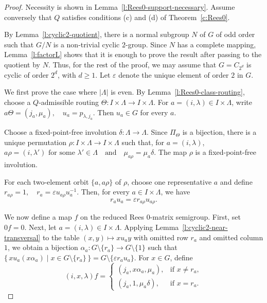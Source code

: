 \documentclass[11pt]{article}
\theoremstyle{plain}
\theoremstyle{remark}
\theoremstyle{definition}
\theoremstyle{plain}
\begin{document}
\begin{proof}
Necessity is shown in Lemma~\ref{l:Rees0-support-necessary}. Assume conversely that
$Q$ satisfies conditions \textup{(c)} and \textup{(d)} of Theorem~\ref{c:Rees0}.

By Lemma~\ref{l:cyclic2-quotient}, there is a normal subgroup $N$ of $G$ of
odd order such that $G/N$ is a non-trivial cyclic $2$-group. Since $N$ has a
complete mapping, Lemma~\ref{l:factorL} shows that it is enough to prove the
result after passing to the quotient by $N$. Thus, for the rest of the proof,
we may assume that
\(G=C_{2^d}\)
is cyclic of order $2^d$, with $d\ge1$. Let $\varepsilon$ denote the unique
element of order $2$ in $G$.

We first prove the case where $|\Lambda|$ is even. By
Lemma~\ref{l:Rees0-class-routing}, choose a $Q$-admissible routing
\(\Theta\colon I\times\Lambda\longrightarrow I\times\Lambda.\)
For $a=(i,\lambda)\in I\times\Lambda$, write
\(a\Theta=(j_a,\mu_a), \quad u_a=p_{\lambda,j_a}.\)
Then $u_a\in G$ for every $a$.

Choose a fixed-point-free involution
\(\delta\colon \Lambda\longrightarrow\Lambda.\)
Since $\Pi_\Theta$ is a bijection, there is a unique permutation
\(\rho\colon I\times\Lambda\longrightarrow I\times\Lambda\)
such that, for $a=(i,\lambda)$,
\(a\rho=(i,\lambda')\text{ for some }\lambda' \in \Lambda \quad\text{and}\quad \mu_{a\rho}=\mu_a\delta.\)
The map $\rho$ is a fixed-point-free involution.

For each two-element orbit $\{a,a\rho\}$ of $\rho$, choose one representative
$a$ and define
\(r_{a\rho}=1, \quad r_a=\varepsilon u_{a\rho}u_a^{-1}.\)
Then, for every $a\in I\times\Lambda$, we have
\begin{equation}\label{eq:Rees0-even-pairing}
        r_au_a=\varepsilon r_{a\rho}u_{a\rho}.
\end{equation}

We now define a map $f$ on the reduced Rees $0$-matrix semigroup. First, set
\(0f=0.\)
Next, let $a=(i,\lambda)\in I\times\Lambda$. Applying
Lemma~\ref{l:cyclic2-near-transversal} to the table
\((x,y)\longmapsto xu_ay\)
with omitted row $r_a$ and omitted column $1$, we obtain a bijection
\(\alpha_a\colon G\setminus\{r_a\}\longrightarrow G\setminus\{1\}\)
such that
\(\{\,xu_a(x\alpha_a)\mid x\in G\setminus\{r_a\}\,\} = G\setminus\{\varepsilon r_au_a\}.\)
For $x\in G$, define
\[
        (i,x,\lambda)f=
        \begin{cases}
        (j_a,x\alpha_a,\mu_a), & \text{if }x\ne r_a,\\[2mm]
        (j_a,1,\mu_a\delta), & \text{if }x=r_a.
        \end{cases}
\]


\end{proof}
\end{document}
